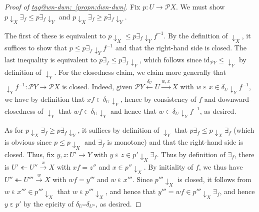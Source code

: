 \documentclass{amsart}
\makeatletter
\newcommand\dwnfn{{\downarrow}}
\newcommand\dwn{\mathpunct{\downarrow}}
\newcommand\ein{\mathrel{\varepsilon}}
\newcommand\id{\mathrm{id}}
\newcommand\I{^{-1}}
\newcommand\oot{\twoheadleftarrow}
\newcommand\pow{\mathcal{P}}
\newcommand\tox[2][]{\xrightarrow[#1]{#2}}
\newcommand\xot[2][]{\xleftarrow[#1]{#2}}
\newcommand\tagword[1]{\csname tag@#1\endcsname}
\def\label@tag#1:#2\@nil{#1}
\newcommand\labeltag[1]{\label@tag#1:\@nil}
\newcommand\jref[1]{%
  \texorpdfstring%
    {\hyperref[#1]{\tagword{\labeltag{#1}}~\ref*{#1}}}%
    {\tagword{\labeltag{#1}}~\ref*{#1}}%
}
\theoremstyle{definition}
\theoremstyle{remark}
\theoremstyle{plainwithref}
\makeatother
\begin{document}
\begin{proof}[Proof of \jref{propn:dwn-dwn}]
  Fix \( p \colon U \to \pow X \).
  We must show \( p \dwn_X \exists_f \le p \exists_f \dwn_Y \) and \( p \dwn_X \exists_f \ge p \exists_f \dwn_Y \).

  The first of these is equivalent to \( p \dwn_X \le p \exists_f \dwn_Y f\I \).
  By the definition of \( \dwn_X \), it suffices to show that \( p \le p \exists_f \dwn_Y f\I \) and that the right-hand side is closed.
  The last inequality is equivalent to \( p \exists_f \le p \exists_f \dwn_Y \), which follows since \( \id_{\pow Y} \le \dwnfn_Y \) by definition of \( \dwn_Y \).
  For the closedness claim, we claim more generally that \( \dwn_Y f\I \colon \pow Y \to \pow X \) is closed.
  Indeed, given \( \pow Y \xot{\delta_U} U \tox{w,x} X \) with \( w \ein x \in \delta_U \dwn_Y f\I \), we have by definition that \( x f \in \delta_U \dwn_Y \), hence by consistency of \( f \) and downward-closedness of \( \dwn_Y \) that \( w f \in \delta_U \dwn_Y \) and hence that \( w \in \delta_U \dwn_Y f\I \), as desired.

  As for \( p \dwn_X \exists_f \ge p \exists_f \dwn_Y \), it suffices by definition of \( \dwn_Y \) that \( p \exists_f \le p \dwn_X \exists_f \) (which is obvious since \( p \le p \dwn_X \) and \( \exists_f \) is monotone) and that the right-hand side is closed.
  Thus, fix \( y,z \colon U' \to Y \) with \( y \ein z \in p' \dwn_X \exists_f \).
  Thus by definition of \( \exists_f \), there is \( U' \oot U'' \tox{x} X \) with \( x f = z'' \) and \( x \in p'' \dwn_X \).
  By initiality of \( f \), we thus have \( U'' \oot U''' \tox{w} X \) with \( w f = y''' \) and \( w \ein x''' \).
  Since \( p''' \dwn_X \) is closed, it follows from \( w \ein x''' \in p''' \dwn_X \) that \( w \ein p''' \dwn_X \), and hence that \( y''' = w f \in p''' \dwn_X \exists_f \), and hence \( y \ein p' \) by the epicity of \( \delta_{U'''} \delta_{U''} \), as desired.
\end{proof}
\end{document}
